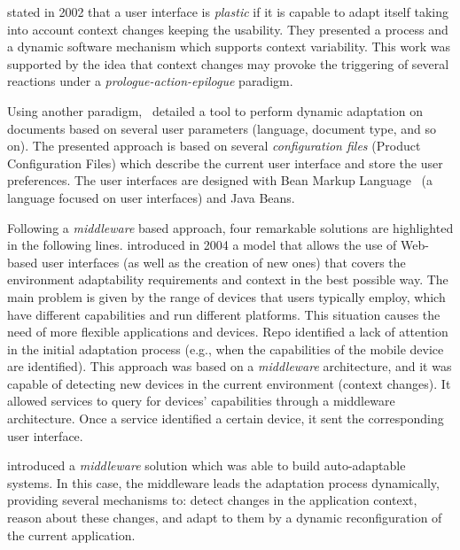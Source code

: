 \citet{calvary_plasticity_2002} stated in 2002 that a user interface is \textit{plastic}
if it is capable to adapt itself taking into account context changes keeping
the usability. They presented a process and a dynamic software mechanism which
supports context variability. This work was supported by the idea that context
changes may provoke the triggering of several reactions under a \textit{prologue-action-epilogue}
paradigm. 

Using another paradigm,~\citet{lehtonen_dynamic_2002} detailed a tool to perform
dynamic adaptation on documents based on several user parameters (language,
document type, and so on). The presented approach is based on several \textit{configuration
files} (Product Configuration Files) which describe the current user interface and
store the user preferences. The user interfaces are designed with Bean Markup
Language~\citep{weerawarana_bean_2001} (a language focused on user interfaces)
and Java Beans.

Following a \textit{middleware} based approach, four remarkable solutions are
highlighted in the following lines. \citet{repo_facilitating_2004} introduced in 
2004 a model that allows the use of Web-based user interfaces (as well as the 
creation of new ones) that covers the environment adaptability requirements and 
context in the best possible way. The main problem is given by the range of 
devices that users typically employ, which have different capabilities and run 
different platforms. This situation causes the need of more flexible applications 
and devices. Repo identified a lack of attention in the initial adaptation process 
(e.g., when the capabilities of the mobile device are identified). This approach 
was based on a \textit{middleware} architecture, and it was capable of detecting 
new devices in the current environment (context changes). It allowed services to 
query for devices' capabilities through a middleware architecture. Once a service 
identified a certain device, it sent the corresponding user interface. 

\citet{nilsson_model_based_2006} introduced a \textit{middleware} solution
which was able to build auto-adaptable systems. In this case, the middleware 
leads the adaptation process dynamically, providing several mechanisms to: 
detect changes in the application context, reason about these changes, and adapt 
to them by a dynamic reconfiguration of the current application. 

